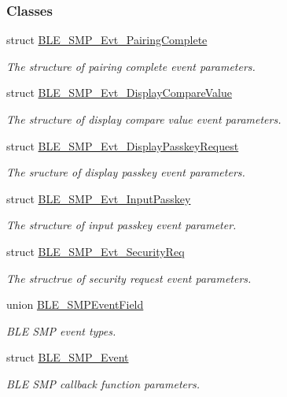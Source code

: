 \subsubsection*{Classes}
\begin{DoxyCompactItemize}
\item 
struct \hyperlink{struct_b_l_e___s_m_p___evt___pairing_complete}{B\+L\+E\+\_\+\+S\+M\+P\+\_\+\+Evt\+\_\+\+Pairing\+Complete}
\begin{DoxyCompactList}\small\item\em The structure of pairing complete event parameters. \end{DoxyCompactList}\item 
struct \hyperlink{struct_b_l_e___s_m_p___evt___display_compare_value}{B\+L\+E\+\_\+\+S\+M\+P\+\_\+\+Evt\+\_\+\+Display\+Compare\+Value}
\begin{DoxyCompactList}\small\item\em The structure of display compare value event parameters. \end{DoxyCompactList}\item 
struct \hyperlink{struct_b_l_e___s_m_p___evt___display_passkey_request}{B\+L\+E\+\_\+\+S\+M\+P\+\_\+\+Evt\+\_\+\+Display\+Passkey\+Request}
\begin{DoxyCompactList}\small\item\em The sructure of display passkey event parameters. \end{DoxyCompactList}\item 
struct \hyperlink{struct_b_l_e___s_m_p___evt___input_passkey}{B\+L\+E\+\_\+\+S\+M\+P\+\_\+\+Evt\+\_\+\+Input\+Passkey}
\begin{DoxyCompactList}\small\item\em The structure of input passkey event parameter. \end{DoxyCompactList}\item 
struct \hyperlink{struct_b_l_e___s_m_p___evt___security_req}{B\+L\+E\+\_\+\+S\+M\+P\+\_\+\+Evt\+\_\+\+Security\+Req}
\begin{DoxyCompactList}\small\item\em The structrue of security request event parameters. \end{DoxyCompactList}\item 
union \hyperlink{union_b_l_e___s_m_p_event_field}{B\+L\+E\+\_\+\+S\+M\+P\+Event\+Field}
\begin{DoxyCompactList}\small\item\em B\+LE S\+MP event types. \end{DoxyCompactList}\item 
struct \hyperlink{struct_b_l_e___s_m_p___event}{B\+L\+E\+\_\+\+S\+M\+P\+\_\+\+Event}
\begin{DoxyCompactList}\small\item\em B\+LE S\+MP callback function parameters. \end{DoxyCompactList}\end{DoxyCompactItemize}
